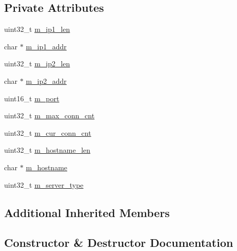 \subsection*{Private Attributes}
\begin{DoxyCompactItemize}
\item 
uint32\+\_\+t \hyperlink{class_c_im_pdu_msg_serv_info_a9a4ece4dd08fc074e90d86571f3991ee}{m\+\_\+ip1\+\_\+len}
\item 
char $\ast$ \hyperlink{class_c_im_pdu_msg_serv_info_a22816de761d47b6e9795d32bb8a3c4b6}{m\+\_\+ip1\+\_\+addr}
\item 
uint32\+\_\+t \hyperlink{class_c_im_pdu_msg_serv_info_ab2dc4f86aff36ca8402bd2deffe690da}{m\+\_\+ip2\+\_\+len}
\item 
char $\ast$ \hyperlink{class_c_im_pdu_msg_serv_info_a5873bfde4fa4d3582b754d0e46f3ea9e}{m\+\_\+ip2\+\_\+addr}
\item 
uint16\+\_\+t \hyperlink{class_c_im_pdu_msg_serv_info_ace8c9df04e7ecc390df81636efa10432}{m\+\_\+port}
\item 
uint32\+\_\+t \hyperlink{class_c_im_pdu_msg_serv_info_a44e1898bd6b18172dbb4c3ac01ca1c8e}{m\+\_\+max\+\_\+conn\+\_\+cnt}
\item 
uint32\+\_\+t \hyperlink{class_c_im_pdu_msg_serv_info_ace6eb10ecb102fdcf692bc4be0c69f55}{m\+\_\+cur\+\_\+conn\+\_\+cnt}
\item 
uint32\+\_\+t \hyperlink{class_c_im_pdu_msg_serv_info_a9e7738545808155b540e0448f08e0383}{m\+\_\+hostname\+\_\+len}
\item 
char $\ast$ \hyperlink{class_c_im_pdu_msg_serv_info_a5fc983e685391bb9095e154294bc3aa4}{m\+\_\+hostname}
\item 
uint32\+\_\+t \hyperlink{class_c_im_pdu_msg_serv_info_acc7c0352af831f16fe196ca8b8460833}{m\+\_\+server\+\_\+type}
\end{DoxyCompactItemize}
\subsection*{Additional Inherited Members}


\subsection{Constructor \& Destructor Documentation}
\hypertarget{class_c_im_pdu_msg_serv_info_a7532473060b500eb6f16480ea0c778d7}{}
